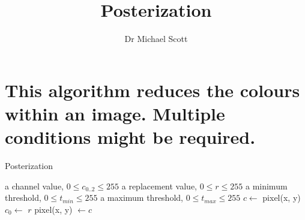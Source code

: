\documentclass{../../../fal_assignment}
\title{Posterization}
\author{Dr Michael Scott}
\begin{document}
\maketitle

	\section{This algorithm reduces the colours within an image. Multiple conditions might be required.}
\begin{algorithm}[ht]
\caption{Posterization}
\label{alg:algorithm}

\begin{algorithmic}[1]
	\Require
	\Statex a channel value,  $0 \leq c_{0..2} \leq 255$
	\Statex a replacement value,  $0 \leq r \leq 255$
	\Statex a minimum threshold,  $0 \leq t_{min} \leq 255$
	\Statex a maximum threshold,  $0 \leq t_{max} \leq 255$
	\State $c \leftarrow$ pixel(x, y)
	\State $c_0 \leftarrow $ $r$
	\State pixel(x, y) $\leftarrow c$
	\EndIf
	\EndFor
	\EndProcedure
\end{algorithmic}

\end{algorithm}
\end{document}
